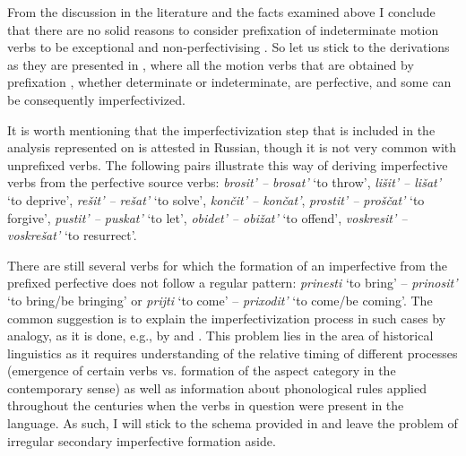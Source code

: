 From the discussion in the literature and the facts examined above I conclude that there are no solid reasons to consider prefixation  of indeterminate motion verbs to be exceptional and non-perfectivising  . So let us stick to the derivations as they are presented in , where all the motion verbs that are obtained by prefixation , whether determinate or indeterminate, are perfective, and some can be consequently imperfectivized.

It is worth mentioning that the imperfectivization  step that is included in the analysis represented on  is attested in Russian, though it is not very common with unprefixed verbs. The following pairs illustrate this way of deriving imperfective verbs  from the perfective source verbs: \textit{brosit'\textsuperscript{\PF} -- brosat'\textsuperscript{\IPF}} `to throw', \textit{li\v{s}it'\textsuperscript{\PF} -- li\v{s}at'\textsuperscript{\IPF}} `to deprive', \textit{re\v{s}it'\textsuperscript{\PF} -- re\v{s}at'\textsuperscript{\IPF}} `to solve', \textit{kon\v{c}it'\textsuperscript{\PF} -- kon\v{c}at'\textsuperscript{\IPF}}, \textit{prostit'\textsuperscript{\PF} -- pro\v{s}\v{c}at'\textsuperscript{\IPF}} `to forgive', \textit{pustit'\textsuperscript{\PF} -- puskat'\textsuperscript{\IPF}} `to let', \textit{obidet'\textsuperscript{\PF} -- obi\v{z}at'\textsuperscript{\IPF}} `to offend', \textit{voskresit'\textsuperscript{\PF} -- voskre\v{s}at'\textsuperscript{\IPF}} `to resurrect'.

There are still several verbs for which the formation of an imperfective from the prefixed perfective does not follow a regular pattern: \textit{prinesti}\textsuperscript{\PF} `to bring' -- \textit{prinosit'}\textsuperscript{\IPF} `to bring/be bringing' or \textit{prijti}\textsuperscript{\PF} `to come' -- \textit{prixodit'}\textsuperscript{\IPF} `to come/be coming'. The common suggestion is to explain the imperfectivization  process in such cases by analogy, as it is done, e.g., by \citet{Regnell:44} and \citet[589]{Shvedova:82}. This problem lies in the area of historical linguistics as it requires understanding of the relative timing of different processes (emergence of certain verbs vs. formation of the aspect category in the contemporary sense) as well as information about phonological rules applied throughout the centuries when the verbs in question were present in the language. As such, I will stick to the schema provided in  and leave the problem of irregular secondary imperfective  formation aside.

